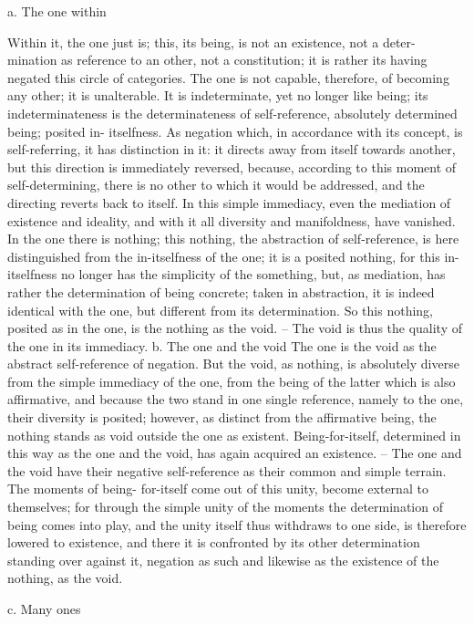 a. The one within

Within it, the one just is; this, its being, is not an existence, not a deter-
mination as reference to an other, not a constitution; it is rather its having
negated this circle of categories. The one is not capable, therefore, of
becoming any other; it is unalterable.
It is indeterminate, yet no longer like being; its indeterminateness is the
determinateness of self-reference, absolutely determined being; posited in-
itselfness. As negation which, in accordance with its concept, is self-referring,
it has distinction in it: it directs away from itself towards another, but this
direction is immediately reversed, because, according to this moment of
self-determining, there is no other to which it would be addressed, and the
directing reverts back to itself.
In this simple immediacy, even the mediation of existence and ideality,
and with it all diversity and manifoldness, have vanished. In the one there is
nothing; this nothing, the abstraction of self-reference, is here distinguished
from the in-itselfness of the one; it is a posited nothing, for this in-itselfness
no longer has the simplicity of the something, but, as mediation, has
rather the determination of being concrete; taken in abstraction, it is
indeed identical with the one, but different from its determination. So this
nothing, posited as in the one, is the nothing as the void. – The void is thus
the quality of the one in its immediacy.
b. The one and the void
The one is the void as the abstract self-reference of negation. But the void,
as nothing, is absolutely diverse from the simple immediacy of the one,
from the being of the latter which is also affirmative, and because the two
stand in one single reference, namely to the one, their diversity is posited;
however, as distinct from the affirmative being, the nothing stands as void
outside the one as existent.
Being-for-itself, determined in this way as the one and the void, has
again acquired an existence. – The one and the void have their negative
self-reference as their common and simple terrain. The moments of being-
for-itself come out of this unity, become external to themselves; for through
the simple unity of the moments the determination of being comes into
play, and the unity itself thus withdraws to one side, is therefore lowered
to existence, and there it is confronted by its other determination standing
over against it, negation as such and likewise as the existence of the nothing,
as the void.

c. Many ones

